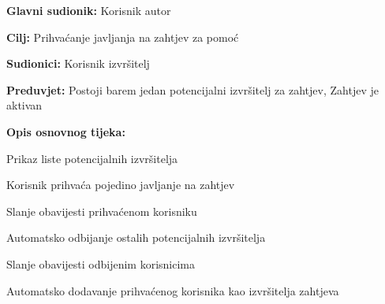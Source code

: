 				
					
					\noindent {}
					\begin{packed_item}
						
						\item \textbf{Glavni sudionik: }Korisnik autor
						\item  \textbf{Cilj:} Prihvaćanje javljanja na zahtjev za pomoć 
						\item  \textbf{Sudionici:} Korisnik izvršitelj
						\item  \textbf{Preduvjet:} Postoji barem jedan potencijalni izvršitelj za zahtjev, Zahtjev je aktivan
						\item  \textbf{Opis osnovnog tijeka:}
						
						\item[] \begin{packed_enum}
							
							\item Prikaz liste potencijalnih izvršitelja
							\item Korisnik prihvaća pojedino javljanje na zahtjev
							\item Slanje obavijesti prihvaćenom korisniku
							\item Automatsko odbijanje ostalih potencijalnih izvršitelja
							\item Slanje obavijesti odbijenim korisnicima
							\item Automatsko dodavanje prihvaćenog korisnika kao izvršitelja zahtjeva
						\end{packed_enum}
						
					\end{packed_item}
				
